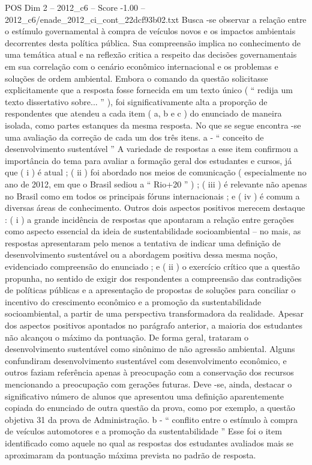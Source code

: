 \begin{textsample}{POS Dim 2 – 2012\_c6 – Score -1.00 – 2012\_c6/enade\_2012\_ci\_cont\_22dcf93b02.txt}
Busca -se observar a relação entre o estímulo governamental à compra de veículos novos e os impactos ambientais decorrentes desta política pública.
Sua compreensão implica no conhecimento de uma temática atual e na reflexão critica a respeito das decisões governamentais em sua correlação com o cenário econômico internacional e os problemas e soluções de ordem ambiental.
Embora o comando da questão solicitasse explicitamente que a resposta fosse fornecida em um texto único ( “ redija um texto dissertativo sobre... ” ), foi significativamente alta a proporção de respondentes que atendeu a cada item ( a, b e c ) do enunciado de maneira isolada, como partes estanques da mesma resposta.
No que se segue encontra -se uma avaliação da correção de cada um dos três itens. a - “ conceito de desenvolvimento sustentável ” A variedade de respostas a esse item confirmou a importância do tema para avaliar a formação geral dos estudantes e cursos, já que ( i ) é atual ; ( ii ) foi abordado nos meios de comunicação ( especialmente no ano de 2012, em que o Brasil sediou a “ Rio+20 ” ) ; ( iii ) é relevante não apenas no Brasil como em todos os principais fóruns internacionais ; e ( iv ) é comum a diversas áreas de conhecimento.
Outros dois aspectos positivos merecem destaque : ( i ) a grande incidência de respostas que apontaram a relação entre gerações como aspecto essencial da ideia de sustentabilidade socioambiental – no mais, as respostas apresentaram pelo menos a tentativa de indicar uma definição de desenvolvimento sustentável ou a abordagem positiva dessa mesma noção, evidenciado compreensão do enunciado ; e ( ii ) o exercício crítico que a questão propunha, no sentido de exigir dos respondentes a compreensão das contradições de políticas públicas e a apresentação de propostas de soluções para conciliar o incentivo do crescimento econômico e a promoção da sustentabilidade socioambiental, a partir de uma perspectiva transformadora da realidade.
Apesar dos aspectos positivos apontados no parágrafo anterior, a maioria dos estudantes não alcançou o máximo da pontuação.
De forma geral, trataram o desenvolvimento sustentável como sinônimo de não agressão ambiental.
Alguns confundiram desenvolvimento sustentável com desenvolvimento econômico, e outros faziam referência apenas à preocupação com a conservação dos recursos mencionando a preocupação com gerações futuras.
Deve -se, ainda, destacar o significativo número de alunos que apresentou uma definição aparentemente copiada do enunciado de outra questão da prova, como por exemplo, a questão objetiva 31 da prova de Administração. b - “ conflito entre o estímulo à compra de veículos automotores e a promoção da sustentabilidade ” Esse foi o item identificado como aquele no qual as respostas dos estudantes avaliados mais se aproximaram da pontuação máxima prevista no padrão de resposta.

\end{textsample}

